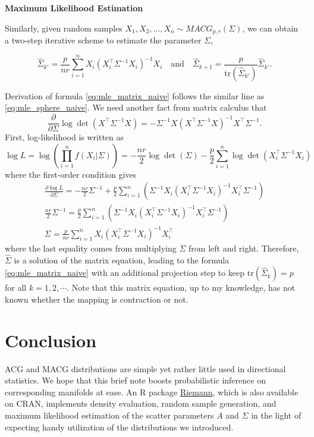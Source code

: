 \documentclass[fontsize=12pt]{article}
\begin{document}
\noindent\textbf{Maximum Likelihood Estimation}

Similarly, given random samples $X_1,X_2,\ldots,X_n \sim MACG_{p,r}(\Sigma)$, we can obtain a two-step iterative scheme to estimate the parameter $\Sigma$,
\begin{mdframed}
	\begin{equation}\label{eq:mle_matrix_naive}
		\hat{\Sigma}_{k'} = \frac{p}{nr} \sum_{i=1}^n 
		X_i (X_i^\top \Sigma^{-1} X_i)^{-1} X_i		 \quad \text{and}\quad \hat{\Sigma}_{k+1} =  \frac{p}{\text{tr}(\hat{\Sigma}_{k'})} \hat{\Sigma}_{k'}.
	\end{equation}
\end{mdframed}

\noindent Derivation of formula \eqref{eq:mle_matrix_naive} follows the similar line as \eqref{eq:mle_sphere_naive}. We need another fact from matrix calculus that
\begin{equation*}
	\frac{\partial }{\partial \Sigma} \log\det(X^\top \Sigma^{-1} X) = - \Sigma^{-1} X (X^\top \Sigma^{-1} X)^{-1} X^\top \Sigma^{-1}.
\end{equation*}
First, log-likelihood is written as
\begin{equation*}
	\log L = \log \left( \prod_{i=1}^n f(X_i|\Sigma) \right) = -\frac{nr}{2}\log\det(\Sigma) - \frac{p}{2}\sum_{i=1}^n \log\det (X_i^\top \Sigma^{-1} X_i)
\end{equation*}
where the first-order condition gives
\begin{gather*}
	\frac{\partial \log L}{\partial \Sigma} = -\frac{nr}{2}\Sigma^{-1} + \frac{p}{2}\sum_{i=1}^n \left( \Sigma^{-1} X_i (X_i^\top \Sigma^{-1} X_i)^{-1} X_i^\top \Sigma^{-1} \right)\\
	\frac{nr}{2} \Sigma^{-1} = \frac{p}{2}\sum_{i=1}^n \left( \Sigma^{-1} X_i (X_i^\top \Sigma^{-1} X_i)^{-1} X_i^\top \Sigma^{-1} \right) \\
	\Sigma = \frac{p}{nr} \sum_{i=1}^n X_i (X_i^\top \Sigma^{-1} X_i)^{-1} X_i^\top
\end{gather*}
where the last equality comes from multiplying $\Sigma$ from left and right. Therefore, $\hat{\Sigma}$ is a solution of the matrix equation, leading to the formula \eqref{eq:mle_matrix_naive} with an additional projection step to keep $\text{tr}(\hat{\Sigma}_k) = p$ for all $k=1,2,\cdots$. Note that this matrix equation, up to my knowledge, has not known whether the mapping is contraction or not. 

\section{Conclusion}

ACG and MACG distributions are simple yet rather little used in directional statistics. We hope that this brief note boosts probabilistic inference on corresponding manifolds at ease. An R package \href{http://kyoustat.com/Riemann/}{\textsf{Riemann}}, which is also available on CRAN, implements density evaluation, random sample generation, and maximum likelihood estimation of the scatter parameters $A$ and $\Sigma$ in the light of expecting handy utilization of the distributions we introduced.



\end{document}
